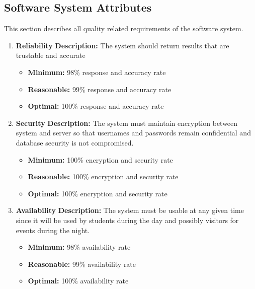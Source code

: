 \documentclass{article}
\begin{document}
	\subsection{Software System Attributes}
	This section describes all quality related requirements of the software system.
	\begin{enumerate}
			\item \textbf{Reliability}\newline
			 \textbf{Description:} The system should return results that are trustable and accurate
			\begin{itemize}
			\item \textbf{Minimum:} 98\% response and accuracy rate
			\item \textbf{Reasonable:} 99\% response and accuracy rate
			\item \textbf{Optimal:} 100\% response and accuracy rate\newline
			\end{itemize}
		
			\item \textbf{Security}\newline
			\textbf{Description:} The system must maintain encryption between system and server so that usernames and passwords remain confidential and database security is not compromised.
			\begin{itemize}
			\item \textbf{Minimum:} 100\% encryption and security rate
			\item \textbf{Reasonable:} 100\% encryption and security rate
			\item \textbf{Optimal:} 100\% encryption and security rate\newline
			\end{itemize}
			
			\item \textbf{Availability}\newline
			\textbf{Description:} The system must be usable at any given time since it will be used by students during the day and possibly visitors for events during the night.
			\begin{itemize}
			\item \textbf{Minimum:} 98\% availability rate
			\item \textbf{Reasonable:} 99\% availability rate
			\item \textbf{Optimal:} 100\% availability rate\newline
			\end{itemize}
			

\end{enumerate}
\end{document}

